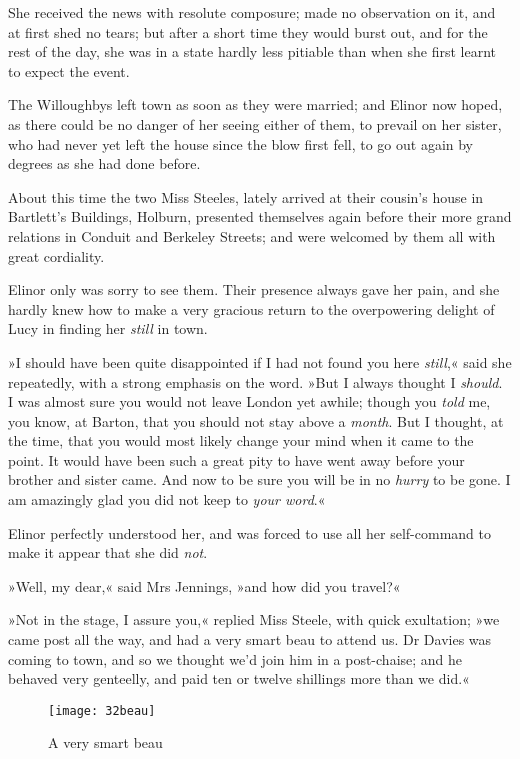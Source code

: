 She received the news with resolute composure; made no observation on it, and at first shed no tears; but after a short time they would burst out, and for the rest of the day, she was in a state hardly less pitiable than when she first learnt to expect the event.

The Willoughbys left town as soon as they were married; and Elinor now hoped, as there could be no danger of her seeing either of them, to prevail on her sister, who had never yet left the house since the blow first fell, to go out again by degrees as she had done before.

About this time the two Miss Steeles, lately arrived at their cousin’s house in Bartlett’s Buildings, Holburn, presented themselves again before their more grand relations in Conduit and Berkeley Streets; and were welcomed by them all with great cordiality.

Elinor only was sorry to see them. Their presence always gave her pain, and she hardly knew how to make a very gracious return to the overpowering delight of Lucy in finding her \textit{still} in town.

»I should have been quite disappointed if I had not found you here \textit{still},« said she repeatedly, with a strong emphasis on the word. »But I always thought I \textit{should}. I was almost sure you would not leave London yet awhile; though you \textit{told} me, you know, at Barton, that you should not stay above a \textit{month}. But I thought, at the time, that you would most likely change your mind when it came to the point. It would have been such a great pity to have went away before your brother and sister came. And now to be sure you will be in no \textit{hurry} to be gone. I am amazingly glad you did not keep to \textit{your word}.«

Elinor perfectly understood her, and was forced to use all her self-command to make it appear that she did \textit{not}.

»Well, my dear,« said Mrs Jennings, »and how did you travel?«

»Not in the stage, I assure you,« replied Miss Steele, with quick exultation; »we came post all the way, and had a very smart beau to attend us. Dr Davies was coming to town, and so we thought we’d join him in a post-chaise; and he behaved very genteelly, and paid ten or twelve shillings more than we did.«

\begin{figure}[tbph]
\centering
\texttt{[image: 32beau]}
\caption{A very smart beau}
\end{figure}

